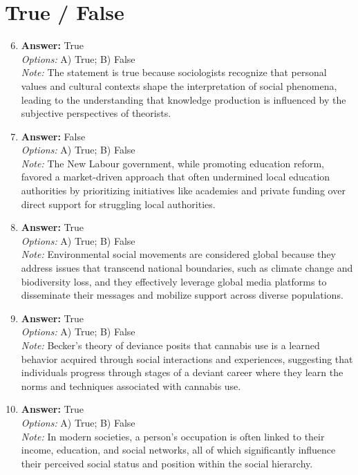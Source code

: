 \documentclass[12pt]{article}
\begin{document}
\section*{True / False}
\begin{enumerate}[label=\arabic*.]
\setcounter{enumi}{5}
\item \textbf{Answer:} True
\\ \textit{Options:} A) True; B) False
\\ \textit{Note:} The statement is true because sociologists recognize that personal values and cultural contexts shape the interpretation of social phenomena, leading to the understanding that knowledge production is influenced by the subjective perspectives of theorists.
\item \textbf{Answer:} False
\\ \textit{Options:} A) True; B) False
\\ \textit{Note:} The New Labour government, while promoting education reform, favored a market-driven approach that often undermined local education authorities by prioritizing initiatives like academies and private funding over direct support for struggling local authorities.
\item \textbf{Answer:} True
\\ \textit{Options:} A) True; B) False
\\ \textit{Note:} Environmental social movements are considered global because they address issues that transcend national boundaries, such as climate change and biodiversity loss, and they effectively leverage global media platforms to disseminate their messages and mobilize support across diverse populations.
\item \textbf{Answer:} True
\\ \textit{Options:} A) True; B) False
\\ \textit{Note:} Becker's theory of deviance posits that cannabis use is a learned behavior acquired through social interactions and experiences, suggesting that individuals progress through stages of a deviant career where they learn the norms and techniques associated with cannabis use.
\item \textbf{Answer:} True
\\ \textit{Options:} A) True; B) False
\\ \textit{Note:} In modern societies, a person's occupation is often linked to their income, education, and social networks, all of which significantly influence their perceived social status and position within the social hierarchy.
\end{enumerate}
\end{document}
